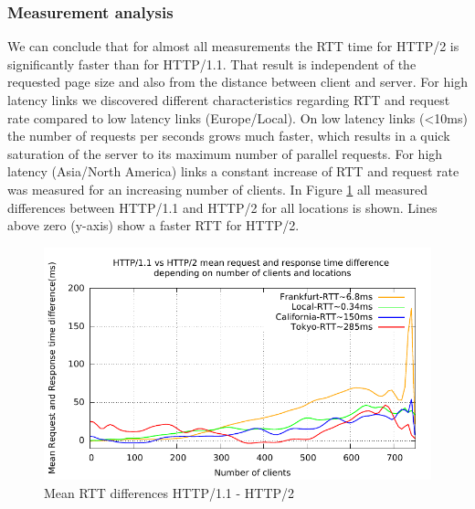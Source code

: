 \subsubsection{Measurement analysis}

We can conclude that for almost all measurements the RTT time for HTTP/2 is significantly faster than for HTTP/1.1. That result is independent of the requested page size and also from the distance between client and server. For high latency links we discovered different characteristics regarding RTT and request rate compared to low latency links (Europe/Local). On low latency links (\textless 10ms) the number of requests per seconds grows much faster, which results in a quick saturation of the server to its maximum number of parallel requests. For high latency (Asia/North America) links a constant increase of RTT and request rate was measured for an increasing number of clients. In Figure \ref{fig:latency-all} all measured differences between HTTP/1.1 and HTTP/2 for all locations is shown. Lines above zero (y-axis) show a faster RTT for HTTP/2.

\begin{figure}[H]
	\centering
	\includegraphics[scale=1,trim=0.0cm .0cm .0cm .0cm,clip]{images/difflatency.pdf}
	\caption{Mean RTT differences HTTP/1.1 - HTTP/2}
	\label{fig:latency-all}
\end{figure}

\newpage
